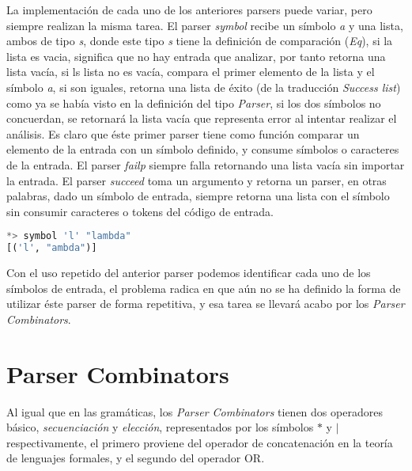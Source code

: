 

La implementación de cada uno de los anteriores parsers puede variar, pero siempre realizan la misma tarea. El parser \emph{symbol} recibe un símbolo \emph{a} y una lista, ambos de tipo \emph{s}, donde este tipo \emph{s} tiene la definición de comparación (\emph{Eq}), si la lista es vacia, significa que no hay entrada que analizar, por tanto retorna una lista vacía, si ls lista no es vacía, compara el primer elemento de la lista y el símbolo \emph{a}, si son iguales, retorna una lista de éxito (de la traducción \emph{Success list}) como ya se había visto en la definición del tipo \emph{Parser}, si los dos símbolos no concuerdan, se retornará la lista vacía que representa error al intentar realizar el análisis. Es claro que éste primer parser tiene como función comparar un elemento de la entrada con un símbolo definido, y consume símbolos o caracteres de la entrada. El parser \emph{failp} siempre falla retornando una lista vacía sin importar la entrada. El parser \emph{succeed} toma un argumento y retorna un parser, en otras palabras, dado un símbolo de entrada, siempre retorna una lista con el símbolo sin consumir caracteres o tokens del código de entrada. \cite{Hutton1996,Jeuring2010,Swierstra2008,Hutton1992}

\begin{lstlisting}[language=Haskell, caption=Ejemplo de la utilización del parser symbol en GHCi]
*> symbol 'l' "lambda"
[('l', "ambda")]
\end{lstlisting}

Con el uso repetido del anterior parser podemos identificar cada uno de los símbolos de entrada, el problema radica en que aún no se ha definido la forma de utilizar éste parser de forma repetitiva, y esa tarea se llevará acabo por los \emph{Parser Combinators}.

\section{Parser Combinators}

Al igual que en las gramáticas, los \emph{Parser Combinators} tienen dos operadores básico,  \emph{secuenciación} y \emph{elección}, representados por los símbolos $*$ y $|$ respectivamente, el primero proviene del operador de concatenación en la teoría de lenguajes formales, y el segundo del operador OR.


